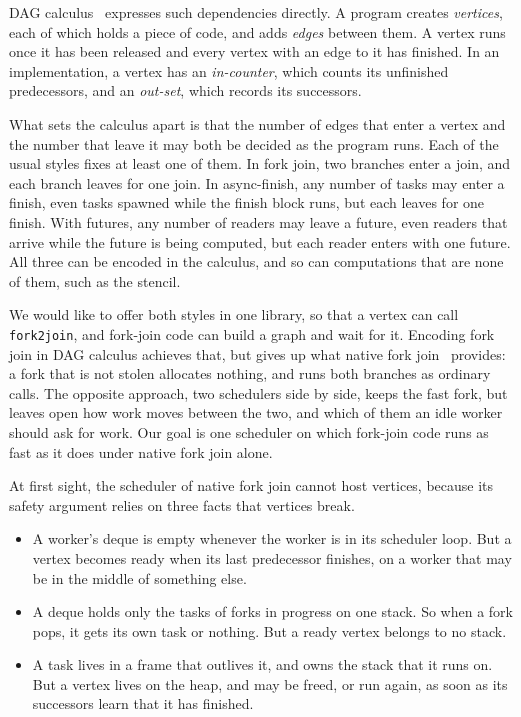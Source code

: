 \documentclass[sigplan,nonacm]{acmart}
\begin{document}
DAG calculus~\cite{Dag_calculus_16} expresses such dependencies
directly.
%
A program creates \emph{vertices}, each of which holds a piece of code,
and adds \emph{edges} between them.
%
A vertex runs once it has been released and every vertex with an edge
to it has finished.
%
In an implementation, a vertex has an \emph{in-counter}, which counts
its unfinished predecessors, and an \emph{out-set}, which records its
successors.

What sets the calculus apart is that the number of edges that enter a
vertex and the number that leave it may both be decided as the program
runs.
%
Each of the usual styles fixes at least one of them.
%
In fork join, two branches enter a join, and each branch leaves for one
join.
%
In async-finish, any number of tasks may enter a finish, even tasks
spawned while the finish block runs, but each leaves for one finish.
%
With futures, any number of readers may leave a future, even readers
that arrive while the future is being computed, but each reader enters
with one future.
%
All three can be encoded in the calculus, and so can computations that
are none of them, such as the stencil.

We would like to offer both styles in one library, so that a vertex can
call \lstinline|fork2join|, and fork-join code can build a graph and
wait for it.
%
Encoding fork join in DAG calculus achieves that, but gives up what
native fork join~\cite{nativeforkjoin} provides: a fork that is not
stolen allocates nothing, and runs both branches as ordinary calls.
%
The opposite approach, two schedulers side by side, keeps the fast fork,
but leaves open how work moves between the two, and which of them an
idle worker should ask for work.
%
Our goal is one scheduler on which fork-join code runs as fast as it
does under native fork join alone.

At first sight, the scheduler of native fork join cannot host vertices,
because its safety argument relies on three facts that vertices break.
%
\begin{itemize}[leftmargin=*]
\item A worker's deque is empty whenever the worker is in its scheduler
  loop.
  But a vertex becomes ready when its last predecessor finishes, on a
  worker that may be in the middle of something else.
\item A deque holds only the tasks of forks in progress on one stack.
  So when a fork pops, it gets its own task or nothing.
  But a ready vertex belongs to no stack.
\item A task lives in a frame that outlives it, and owns the stack that
  it runs on.
  But a vertex lives on the heap, and may be freed, or run again, as
  soon as its successors learn that it has finished.
\end{itemize}
\end{document}
